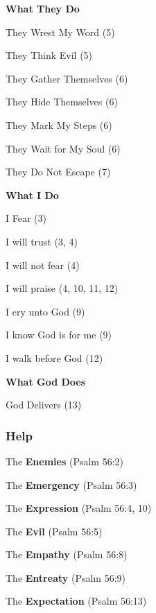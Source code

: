 \begin{compactenum}[I.][3]
    \item \textbf{What They Do}
    \begin{compactenum}[A.]
        \item They Wrest My Word (5)
        \item They Think Evil (5)
        \item They Gather Themselves (6)
        \item They Hide Themselves (6)
        \item They Mark My Steps (6)
        \item They Wait for My Soul (6)
        \item They Do Not Escape (7)
    \end{compactenum}
    \item \textbf{What I Do}
    \begin{compactenum}[A.]
       \item I Fear (3)
       \item I will trust (3, 4)
        \item I will not fear (4)
        \item I will praise (4, 10, 11, 12)
        \item I cry unto God (9)
        \item I know God is for me (9)
        \item I walk before God (12)
    \end{compactenum}    
    \item \textbf{What God Does}
    \begin{compactenum}[A.]
        \item God Delivers (13)
    \end{compactenum}
\end{compactenum}


\subsubsection{Help}


\begin{compactenum}[I.]
    \item The \textbf{Enemies} (Psalm 56:2) 
    \item The \textbf{Emergency} (Psalm 56:3) 
    \item The \textbf{Expression}  (Psalm 56:4, 10) 
    \item The \textbf{Evil} (Psalm 56:5) 
    \item The \textbf{Empathy} (Psalm 56:8) 
    \item The \textbf{Entreaty} (Psalm 56:9) 
    \item The \textbf{Expectation} (Psalm 56:13) 
\end{compactenum}